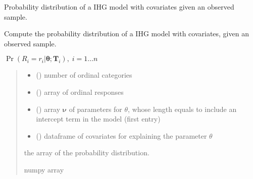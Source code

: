 \documentclass[letterpaper,10pt,english]{sphinxmanual}
\begin{document}
\begin{fulllineitems}
\label{\detokenize{cubmods:cubmods.ihg_v.prob}}
\pysigstartsignatures
{}
\pysigstopsignatures
\sphinxAtStartPar
Probability distribution of a IHG model with covariates
given an observed sample.

\sphinxAtStartPar
Compute the probability distribution of a IHG model with covariates, 
given an observed sample.

\sphinxAtStartPar
\(\Pr(R_i=r_i|\pmb\theta;\pmb T_i),\; i=1 \ldots n\)
\begin{quote}\begin{description}
\begin{itemize}
\item {} 
\sphinxAtStartPar
{} () \textendash{} number of ordinal categories

\item {} 
\sphinxAtStartPar
{} () \textendash{} array of ordinal responses

\item {} 
\sphinxAtStartPar
{} () \textendash{} array \(\pmb \nu\) of parameters for \(\theta\), whose length equals 
 to include an intercept term in the model (first entry)

\item {} 
\sphinxAtStartPar
{} () \textendash{} dataframe of covariates for explaining the parameter \(\theta\)

\end{itemize}

\sphinxAtStartPar
the array of the probability distribution.

\sphinxAtStartPar
numpy array

\end{description}\end{quote}

\end{fulllineitems}
\end{document}

